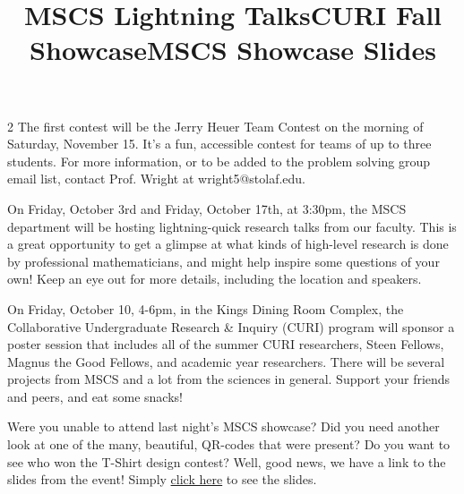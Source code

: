 \documentclass[12pt]{article}
\newcommand{\bolder}{\textbf}
\begin{document}
\begin{multicols}{2}
The first contest will be the Jerry Heuer Team Contest on the morning of Saturday, November 15. It's a fun, accessible contest for teams of up to three students. For more information, or to be added to the problem solving group email list, contact Prof. Wright at wright5@stolaf.edu.

\begin{tcolorbox}[colback=white, colframe=black]
    \begin{center}
    \title{{\large \bolder{MSCS Lightning Talks}}}
    \end{center}
\end{tcolorbox}

On Friday, October 3rd and Friday, October 17th, at 3:30pm, the MSCS department will be hosting lightning-quick research talks from our faculty. This is a great opportunity to get a glimpse at what kinds of high-level research is done by professional mathematicians, and might help inspire some questions of your own! Keep an eye out for more details, including the location and speakers. 


\begin{tcolorbox}[colback=white, colframe=black]
    \begin{center}
    \title{{\large \bolder{CURI Fall Showcase}}}
    \end{center}
\end{tcolorbox}

On Friday, October 10, 4-6pm, in the Kings Dining Room Complex, the Collaborative Undergraduate Research \& Inquiry (CURI) program will sponsor a poster session that includes all of the summer CURI researchers, Steen Fellows, Magnus the Good Fellows, and academic year researchers. There will be several projects from MSCS and a lot from the sciences in general. Support your friends and peers, and eat some snacks!

\begin{tcolorbox}[colback=white, colframe=black]
    \begin{center}
    \title{{\large \bolder{MSCS Showcase Slides}}}
    \end{center}
\end{tcolorbox}

Were you unable to attend last night's MSCS showcase? Did you need another look at one of the many, beautiful, QR-codes that were present? Do you want to see who won the T-Shirt design contest? Well, good news, we have a link to the slides from the event! Simply \href{https://docs.google.com/presentation/d/1O5sYFECLDzFmhCGYGN8RDvLf0Y3uvXI2AQ5WfFFk3D0/edit?usp=sharing}{click here} to see the slides. \\ \, \\ \,


\end{multicols}
\end{document}
